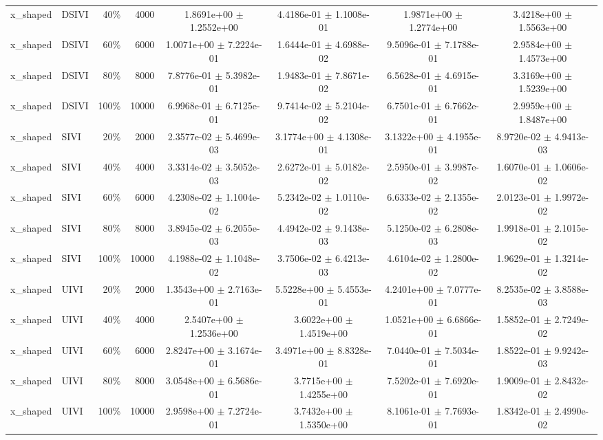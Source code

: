 \begin{tabular}{llrrcccc}
x\_shaped & DSIVI & 40\% & 4000 & 1.8691e+00 $\pm$ 1.2552e+00 & 4.4186e-01 $\pm$ 1.1008e-01 & 1.9871e+00 $\pm$ 1.2774e+00 & 3.4218e+00 $\pm$ 1.5563e+00 \\
x\_shaped & DSIVI & 60\% & 6000 & 1.0071e+00 $\pm$ 7.2224e-01 & 1.6444e-01 $\pm$ 4.6988e-02 & 9.5096e-01 $\pm$ 7.1788e-01 & 2.9584e+00 $\pm$ 1.4573e+00 \\
x\_shaped & DSIVI & 80\% & 8000 & 7.8776e-01 $\pm$ 5.3982e-01 & 1.9483e-01 $\pm$ 7.8671e-02 & 6.5628e-01 $\pm$ 4.6915e-01 & 3.3169e+00 $\pm$ 1.5239e+00 \\
x\_shaped & DSIVI & 100\% & 10000 & 6.9968e-01 $\pm$ 6.7125e-01 & 9.7414e-02 $\pm$ 5.2104e-02 & 6.7501e-01 $\pm$ 6.7662e-01 & 2.9959e+00 $\pm$ 1.8487e+00 \\
x\_shaped & SIVI & 20\% & 2000 & 2.3577e-02 $\pm$ 5.4699e-03 & 3.1774e+00 $\pm$ 4.1308e-01 & 3.1322e+00 $\pm$ 4.1955e-01 & 8.9720e-02 $\pm$ 4.9413e-03 \\
x\_shaped & SIVI & 40\% & 4000 & 3.3314e-02 $\pm$ 3.5052e-03 & 2.6272e-01 $\pm$ 5.0182e-02 & 2.5950e-01 $\pm$ 3.9987e-02 & 1.6070e-01 $\pm$ 1.0606e-02 \\
x\_shaped & SIVI & 60\% & 6000 & 4.2308e-02 $\pm$ 1.1004e-02 & 5.2342e-02 $\pm$ 1.0110e-02 & 6.6333e-02 $\pm$ 2.1355e-02 & 2.0123e-01 $\pm$ 1.9972e-02 \\
x\_shaped & SIVI & 80\% & 8000 & 3.8945e-02 $\pm$ 6.2055e-03 & 4.4942e-02 $\pm$ 9.1438e-03 & 5.1250e-02 $\pm$ 6.2808e-03 & 1.9918e-01 $\pm$ 2.1015e-02 \\
x\_shaped & SIVI & 100\% & 10000 & 4.1988e-02 $\pm$ 1.1048e-02 & 3.7506e-02 $\pm$ 6.4213e-03 & 4.6104e-02 $\pm$ 1.2800e-02 & 1.9629e-01 $\pm$ 1.3214e-02 \\
x\_shaped & UIVI & 20\% & 2000 & 1.3543e+00 $\pm$ 2.7163e-01 & 5.5228e+00 $\pm$ 5.4553e-01 & 4.2401e+00 $\pm$ 7.0777e-01 & 8.2535e-02 $\pm$ 3.8588e-03 \\
x\_shaped & UIVI & 40\% & 4000 & 2.5407e+00 $\pm$ 1.2536e+00 & 3.6022e+00 $\pm$ 1.4519e+00 & 1.0521e+00 $\pm$ 6.6866e-01 & 1.5852e-01 $\pm$ 2.7249e-02 \\
x\_shaped & UIVI & 60\% & 6000 & 2.8247e+00 $\pm$ 3.1674e-01 & 3.4971e+00 $\pm$ 8.8328e-01 & 7.0440e-01 $\pm$ 7.5034e-01 & 1.8522e-01 $\pm$ 9.9242e-03 \\
x\_shaped & UIVI & 80\% & 8000 & 3.0548e+00 $\pm$ 6.5686e-01 & 3.7715e+00 $\pm$ 1.4255e+00 & 7.5202e-01 $\pm$ 7.6920e-01 & 1.9009e-01 $\pm$ 2.8432e-02 \\
x\_shaped & UIVI & 100\% & 10000 & 2.9598e+00 $\pm$ 7.2724e-01 & 3.7432e+00 $\pm$ 1.5350e+00 & 8.1061e-01 $\pm$ 7.7693e-01 & 1.8342e-01 $\pm$ 2.4990e-02 \\
\bottomrule
\end{tabular}

